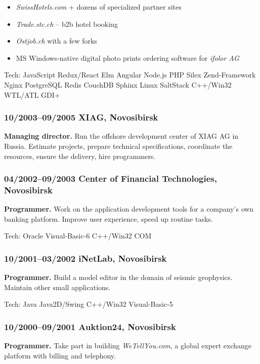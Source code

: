 \documentclass[a4paper, twocolumn, 10pt]{article}
\begin{document}
\begin{itemize}
  \itemsep0em
  \item \emph{SwissHotels.com} + dozens of specialized partner sites
  \item \emph{Trade.stc.ch} -- b2b hotel booking
  \item \emph{Ostjob.ch} with a few forks
  \item MS Windows-native digital photo prints ordering software for \emph{ifolor AG}
\end{itemize}

Tech: JavaScript Redux/React Elm Angular Node.js PHP Silex Zend-Framework Nginx PostgreSQL
Redis CouchDB Sphinx Linux SaltStack C++/Win32 WTL/ATL GDI+

\subsubsection*{10/2003--09/2005 XIAG, Novosibirsk}

\textbf{Managing director.} Run the offshore development center of XIAG AG in
Russia. Estimate projects, prepare technical specifications, coordinate the resources, ensure the
delivery, hire programmers.

\subsubsection*{04/2002--09/2003 Center of Financial Technologies, Novosibirsk}

\textbf{Programmer.} Work on the application development tools for a company's own banking
platform. Improve user experience, speed up routine tasks.

Tech: Oracle Visual-Basic-6 C++/Win32 COM

\subsubsection*{10/2001--03/2002 iNetLab, Novosibirsk}

\textbf{Programmer.} Build a model editor in the domain of seismic geophysics. Maintain other small
applications.

Tech: Java Java2D/Swing C++/Win32 Visual-Basic-5

\subsubsection*{10/2000--09/2001 Auktion24, Novosibirsk}

\textbf{Programmer.} Take part in building \emph{WeTellYou.com}, a global expert exchange platform
with billing and telephony.
\end{document}
